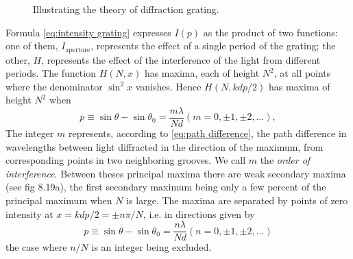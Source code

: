 \documentclass[12pt,twoside,english]{book}
\renewcommand{\~}{\perispomeni}%
\numberwithin{equation}{section}
\numberwithin{figure}{section}
\begin{document}
\begin{figure}
\begin{minipage}[t]{0.48\textwidth}

\caption{Illustrating the theory of diffraction grating.}
\label{fig:grating ray}
\end{minipage}
\hfill
\begin{minipage}[t]{0.48\textwidth}
%
\caption{}
\label{fig:aperture coord}
\end{minipage}
\end{figure}

Formula \ref{eq:intensity grating} expresses $I\left(p\right)$ as the product of two functions: one of them, $I_{\text{aperture}}$, represents the effect of a single period of the grating; the other, $H$, represents the effect of the interference of the light from different periods. The function $H\left(N,x\right)$ has maxima, each of height $N^{2}$, at all points where the denominator $\sin^2 x$ vanishes. Hence $H\left(N,kdp/2\right)$ has maxima of height $N^2$ when
\begin{equation}
p\equiv\sin\theta-\sin\theta_{0}=\frac{m\lambda}{Nd}\left(m=0,\pm1,\pm2,\ldots\right),
\label{eq:grating equation}
\end{equation}
The integer $m$ represents, according to \ref{eq:path difference}, the path difference in wavelengths between light diffracted in the direction of the maximum, from corresponding points in two neighboring grooves. We call $m$ the \emph{order of interference}. Between theses principal maxima there are weak secondary maxima (see fig 8.19a), the first secondary maximum being only a few percent of the principal maximum when $N$ is large. The maxima are separated by points of zero intensity at $x=kdp/2=\pm n\pi/N$, i.e. in directions given by\begin{equation}
p\equiv\sin\theta-\sin\theta_{0}=\frac{n\lambda}{Nd}\left(n=0,\pm1,\pm2,\ldots\right)\label{eq: grating secondary maxima}\end{equation}
the case where $n/N$ is an integer being excluded.
\end{document}
